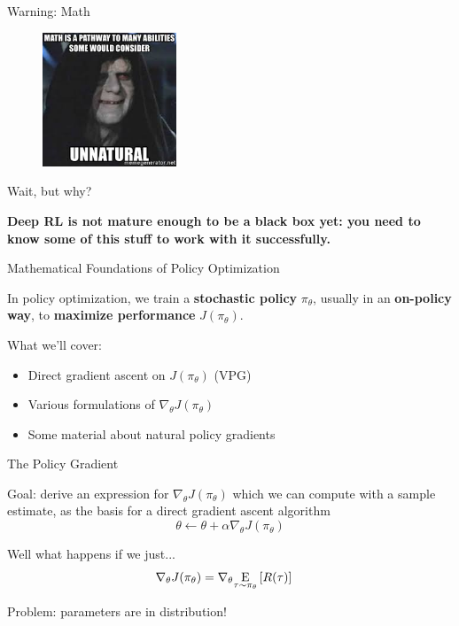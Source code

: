 \documentclass[9pt]{beamer}
\newcommand{\underE}[2]{\underset{\begin{subarray}{c}#1 \end{subarray}}{\E}\left[ #2 \right]}
\begin{document}
\begin{frame}{Warning: Math}

\begin{figure}
\centering
\includegraphics[width=4cm]{palpatine}
\end{figure}

\end{frame}

\begin{frame}{Wait, but why?}


\textbf{Deep RL is not mature enough to be a black box yet: you need to know some of this stuff to work with it successfully.}

\end{frame}

\begin{frame}{Mathematical Foundations of Policy Optimization}

In policy optimization, we train a \textbf{stochastic policy} $\pi_{\theta}$, usually in an \textbf{on-policy way}, to \textbf{maximize performance} $J(\pi_{\theta})$.

\vspace{1em}

What we'll cover:
\begin{itemize}
\item Direct gradient ascent on $J(\pi_{\theta})$ (VPG)
\item Various formulations of $\nabla_{\theta} J(\pi_{\theta})$
\item Some material about natural policy gradients
\end{itemize}

\end{frame}

\begin{frame}{The Policy Gradient}

Goal: derive an expression for $\nabla_{\theta} J(\pi_{\theta})$ which we can compute with a sample estimate, as the basis for a direct gradient ascent algorithm
%
\begin{equation*}
\theta \leftarrow \theta + \alpha \nabla_{\theta} J(\pi_{\theta})
\end{equation*}

\pause
\vspace{1em}

Well what happens if we just...
%
\begin{align*}
\nabla_{\theta} J(\pi_{\theta}) &= \nabla_{\theta} \underE{\tau \sim \pi_{\theta}}{R(\tau)}
\end{align*}

Problem: parameters are in distribution!

\end{frame}
\end{document}
